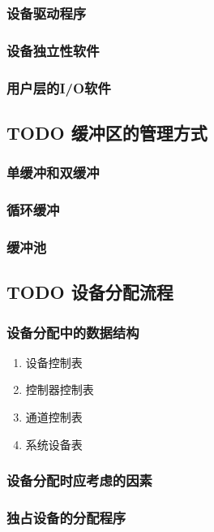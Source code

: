 \documentclass[11pt]{article}
\begin{document}
\subsubsection{设备驱动程序}
\label{sec-5-3-2}
\subsubsection{设备独立性软件}
\label{sec-5-3-3}
\subsubsection{用户层的I/O软件}
\label{sec-5-3-4}
\subsection{{\bfseries\sffamily TODO} 缓冲区的管理方式}
\label{sec-5-4}
\subsubsection{单缓冲和双缓冲}
\label{sec-5-4-1}
\subsubsection{循环缓冲}
\label{sec-5-4-2}
\subsubsection{缓冲池}
\label{sec-5-4-3}
\subsection{{\bfseries\sffamily TODO} 设备分配流程}
\label{sec-5-5}
\subsubsection{设备分配中的数据结构}
\label{sec-5-5-1}
\begin{enumerate}
\item 设备控制表
\label{sec-5-5-1-1}
\item 控制器控制表
\label{sec-5-5-1-2}
\item 通道控制表
\label{sec-5-5-1-3}
\item 系统设备表
\label{sec-5-5-1-4}
\end{enumerate}
\subsubsection{设备分配时应考虑的因素}
\label{sec-5-5-2}
\subsubsection{独占设备的分配程序}
\label{sec-5-5-3}
\end{document}
